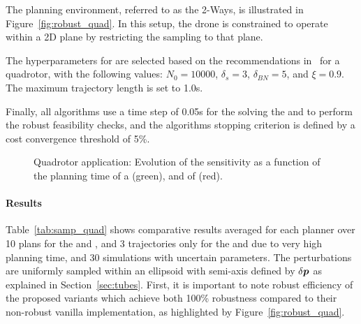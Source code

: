 The planning environment, referred to as the 2-Ways, is illustrated in Figure~\ref{fig:robust_quad}. 
In this setup, the drone is constrained to operate within a 2D plane by restricting the sampling to that plane.

The hyperparameters for  are selected based on the recommendations in~\cite{cSST} for a quadrotor, with the following values: $N_0 = 10000$, $\delta_s = 3$, $\delta_{BN} = 5$, and $\xi = 0.9$.
The maximum trajectory length is set to 1.0s.

Finally, all algorithms use a time step of 0.05s for the solving the  and to perform the robust feasibility checks, and the algorithms stopping criterion is defined by a cost convergence threshold of 5\%.



\begin{figure} [h!]
    \centering
     
    \caption{Quadrotor application: Evolution of the sensitivity as a function of the planning time of a  (green), and of  (red).}%
    \label{fig:samp_quad_time}%
\end{figure}

\paragraph{Results}

Table~\ref{tab:samp_quad} shows comparative results averaged for each planner over 10 plans for the  and , and 3 trajectories only for the  and  due to very high planning time, and 30 simulations with uncertain parameters. 
The perturbations are uniformly sampled within an ellipsoid with semi-axis defined by $\delta \boldsymbol{p}$ as explained in Section~\ref{sec:tubes}.
First, it is important to note robust efficiency of the proposed  variants which achieve both 100\% robustness compared to their non-robust vanilla implementation, as highlighted by Figure~\ref{fig:robust_quad}.

